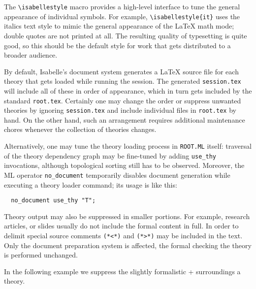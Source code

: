 \begin{isabellebody}
\begin{isamarkuptext}
  \medskip The \verb,\isabellestyle, macro provides a high-level
  interface to tune the general appearance of individual symbols.  For
  example, \verb,\isabellestyle{it}, uses the italics text style to
  mimic the general appearance of the {\LaTeX} math mode; double
  quotes are not printed at all.  The resulting quality of typesetting
  is quite good, so this should be the default style for work that
  gets distributed to a broader audience.%
\end{isamarkuptext}%
\isamarkuptrue%
%
\isamarkuptrue%
%
\begin{isamarkuptext}%
By default, Isabelle's document system generates a {\LaTeX} source
  file for each theory that gets loaded while running the session.
  The generated \texttt{session.tex} will include all of these in
  order of appearance, which in turn gets included by the standard
  \texttt{root.tex}.  Certainly one may change the order or suppress
  unwanted theories by ignoring \texttt{session.tex} and include
  individual files in \texttt{root.tex} by hand.  On the other hand,
  such an arrangement requires additional maintenance chores whenever
  the collection of theories changes.

  Alternatively, one may tune the theory loading process in
  \texttt{ROOT.ML} itself: traversal of the theory dependency graph
  may be fine-tuned by adding \verb,use_thy, invocations, although
  topological sorting still has to be observed.  Moreover, the ML
  operator \verb,no_document, temporarily disables document generation
  while executing a theory loader command; its usage is like this:

\begin{verbatim}
  no_document use_thy "T";
\end{verbatim}

  \medskip Theory output may also be suppressed in smaller portions.
  For example, research articles, or slides usually do not include the
  formal content in full.  In order to delimit  special source comments
  \verb,(,\verb,*,\verb,<,\verb,*,\verb,), and
  \verb,(,\verb,*,\verb,>,\verb,*,\verb,), may be included in the
  text.  Only the document preparation system is affected, the formal
  checking the theory is performed unchanged.

  In the following example we suppress the slightly formalistic
   +  surroundings a theory.


\end{isamarkuptext}
\end{isabellebody}
